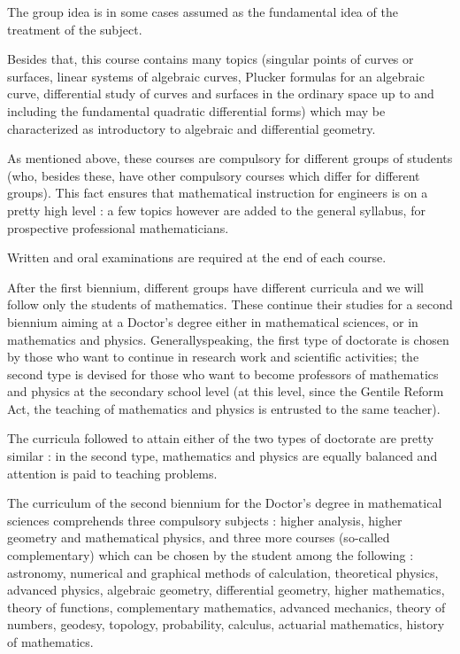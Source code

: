 The group idea is in some cases assumed as the fundamental idea of the treatment of the subject.

Besides that, this course contains many topics (singular points of curves or surfaces, linear systems of algebraic curves, Plucker formulas for an algebraic curve, differential study of curves and surfaces in the ordinary space up to and including the fundamental quadratic differential forms) which may be characterized as introductory to algebraic and differential geometry.

As mentioned above, these courses are compulsory for different groups of students (who, besides these, have other compulsory courses which differ for different groups). This fact ensures that mathematical instruction for engineers is on a pretty high level : a few topics however are added to the general syllabus, for prospective professional mathematicians.

Written and oral examinations are required at the end of each course.

After the first biennium, different groups have different curricula and we will follow only the students of mathematics. These continue their studies for a second biennium aiming at a Doctor's degree either in mathematical sciences, or in mathematics and physics. Generally\pageoriginale speaking, the first type of doctorate is chosen by those who want to continue in research work and scientific activities; the second type is devised for those who want to become professors of mathematics and physics at the secondary school level (at this level, since the Gentile Reform Act, the teaching of mathematics and physics is entrusted to the same teacher).

The curricula followed to attain either of the two types of doctorate are pretty similar : in the second type, mathematics and physics are equally balanced and attention is paid to teaching problems.

The curriculum of the second biennium for the Doctor's degree in mathematical sciences comprehends three compulsory subjects : higher analysis, higher geometry and mathematical physics, and three more courses (so-called complementary) which can be chosen by the student among the following : astronomy, numerical and graphical methods of calculation, theoretical physics, advanced physics, algebraic geometry, differential geometry, higher mathematics, theory of functions, complementary mathematics, advanced mechanics, theory of numbers, geodesy, topology, probability, calculus, actuarial mathematics, history of mathematics.

